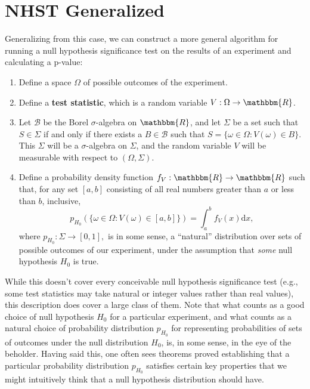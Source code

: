 \documentclass[11pt]{article}
\theoremstyle{definition}
\theoremstyle{remark}
\begin{document}
\section{NHST Generalized}
Generalizing from this case, we can construct a more general algorithm for running a null hypothesis significance test on the results of an experiment and calculating a p-value:
\begin{enumerate}
    \item Define a space $\Omega$ of possible outcomes of the experiment.

    \item Define a \textbf{test statistic}, which is a random variable $V:\Omega\rightarrow\mathbbm{R}$.

    \item Let $\mathcal{B}$ be the Borel $\sigma$-algebra on $\mathbbm{R}$, and let $\Sigma$ be a set such that $S\in\Sigma$ if and only if there exists a $B\in \mathcal{B}$ such that $S=\{\omega\in\Omega:V(\omega)\in B\}$. This $\Sigma$ will be a $\sigma$-algebra on $\Sigma$, and the random variable $V$ will be measurable with respect to $(\Omega,\Sigma)$.

    \item Define a probability density function $f_{V}:\mathbbm{R}\rightarrow\mathbbm{R}$ such that, for any set $[a,b]$ consisting of all real numbers greater than $a$ or less than $b$, inclusive, $$p_{H_{0}}(\{\omega\in\Omega:V(\omega)\in[a,b]\})=\int_{a}^{b}f_{V}(x)\textrm{d}x,$$
    where $p_{H_{0}}:\Sigma\rightarrow[0,1],$ is in some sense, a ``natural'' distribution over sets of possible outcomes of our experiment, under the assumption that \textit{some} null hypothesis $H_{0}$ is true.
\end{enumerate}
While this doesn't cover every conceivable null hypothesis significance test (e.g., some test statistics may take natural or integer values rather than real values), this description does cover a large class of them. Note that what counts as a good choice of null hypothesis $H_{0}$ for a particular experiment, and what counts as a natural choice of probability distribution $p_{H_{0}}$ for representing probabilities of sets of outcomes under the null distribution $H_{0}$, is, in some sense, in the eye of the beholder. Having said this, one often sees theorems proved establishing that a particular probability distribution $p_{H_{0}}$ satisfies certain key properties that we might intuitively think that a null hypothesis distribution should have.\par 
\end{document}
